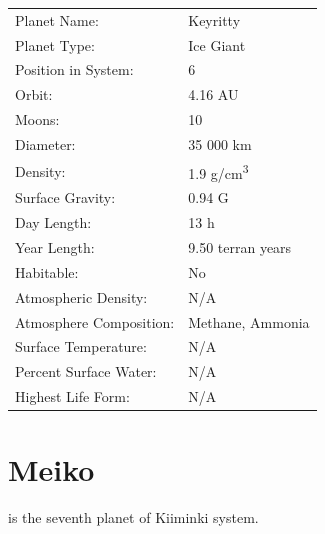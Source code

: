 \documentclass{tufte-book}
\begin{document}
\bigskip
\begin{minipage}{\textwidth}
\begin{center}
\begin{tabular}{ll}
\toprule
Planet Name: & Keyritty \\
Planet Type: & Ice Giant \\
Position in System: & 6 \\
Orbit: & 4.16 AU \\
Moons: & 10 \\
Diameter: & 35 000 km \\
Density: & 1.9 g/cm\textsuperscript{3} \\
Surface Gravity: & 0.94 G \\
Day Length: & 13 h \\
Year Length: & 9.50 terran years \\
Habitable: & No \\
\quad Atmospheric Density: & N/A \\
\quad Atmosphere Composition: & Methane, Ammonia \\
\quad Surface Temperature: & N/A \\
\quad Percent Surface Water: & N/A \\
\quad Highest Life Form: & N/A \\

\bottomrule
\end{tabular}
\end{center}
\end{minipage}


\section{Meiko}

 is the seventh planet of Kiiminki system.
\end{document}
